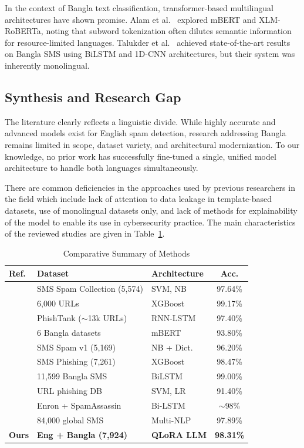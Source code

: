 \documentclass[journal]{IEEEtran}
\begin{document}
In the context of Bangla text classification, transformer-based multilingual architectures have shown promise. Alam et al.~\cite{ref4} explored mBERT and XLM-RoBERTa, noting that subword tokenization often dilutes semantic information for resource-limited languages. Talukder et al.~\cite{ref7} achieved state-of-the-art results on Bangla SMS using BiLSTM and 1D-CNN architectures, but their system was inherently monolingual.

\subsection{Synthesis and Research Gap}

The literature clearly reflects a linguistic divide. While highly accurate and advanced models exist for English spam detection, research addressing Bangla remains limited in scope, dataset variety, and architectural modernization. To our knowledge, no prior work has successfully fine-tuned a single, unified model architecture to handle both languages simultaneously.

There are common deficiencies in the approaches used by
previous researchers in the field which include lack of attention to
data leakage in template-based datasets, use of monolingual datasets
only, and lack of methods for explainability of the model to enable its
use in cybersecurity practice. The main characteristics of the reviewed
studies are given in Table~\ref{tab:comparative}.

\begin{table}[htbp]
\caption{Comparative Summary of Methods}
\label{tab:comparative}
\centering
\begin{tabular}{lllc}
\toprule
\textbf{Ref.} & \textbf{Dataset} & \textbf{Architecture} & \textbf{Acc.} \\
\midrule
\cite{ref1} & SMS Spam Collection (5,574) & SVM, NB & 97.64\% \\
\cite{ref2} & 6,000 URLs & XGBoost & 99.17\% \\
\cite{ref3} & PhishTank ($\sim$13k URLs) & RNN-LSTM & 97.40\% \\
\cite{ref4} & 6 Bangla datasets & mBERT & 93.80\% \\
\cite{ref5} & SMS Spam v1 (5,169) & NB + Dict. & 96.20\% \\
\cite{ref6} & SMS Phishing (7,261) & XGBoost & 98.47\% \\
\cite{ref7} & 11,599 Bangla SMS & BiLSTM & 99.00\% \\
\cite{ref8} & URL phishing DB & SVM, LR & 91.40\% \\
\cite{ref9} & Enron + SpamAssassin & Bi-LSTM & $\sim$98\% \\
\cite{ref10} & 84,000 global SMS & Multi-NLP & 97.89\% \\
\textbf{Ours} & \textbf{Eng + Bangla (7,924)} & \textbf{QLoRA LLM} & \textbf{98.31\%} \\
\bottomrule
\end{tabular}
\end{table}
\end{document}
